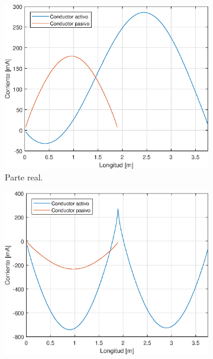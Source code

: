 %		
%		

\begin{figure}[H]
	\begin{subfigure}{0.5\textwidth}
		\includegraphics[scale=0.6]{imagenes/i_real_80.eps}
		\caption{Parte real.}
	\end{subfigure}
	\quad
	\begin{subfigure}{0.5\textwidth}
		\includegraphics[scale=0.6]{imagenes/i_imag_80.eps}

\end{subfigure}
\end{figure}
